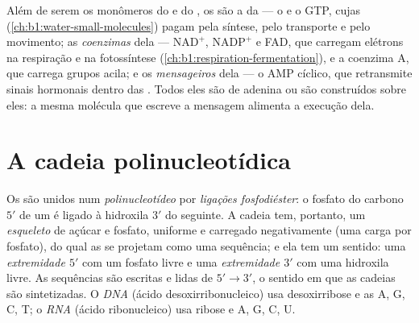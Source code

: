 \begin{proposition}\label{prop:b1:nucleic-acids:threejobs}
Além de serem os monômeros do  e do , os  são a
\emph{} da  --- o  e o GTP, cujas  (\cref{ch:b1:water-small-molecules}) pagam pela síntese,
pelo transporte e pelo movimento; as \emph{coenzimas} dela ---
$\mathrm{NAD^+}$, $\mathrm{NADP^+}$ e FAD, que carregam elétrons na
respiração e na fotossíntese
(\cref{ch:b1:respiration-fermentation}), e a coenzima A, que carrega
grupos acila; e os \emph{mensageiros} dela --- o AMP cíclico, que
retransmite sinais hormonais dentro das . Todos eles são
 de adenina ou são construídos sobre eles: a mesma molécula
que escreve a mensagem alimenta a execução dela.
\end{proposition}

\section{A cadeia polinucleotídica}

\begin{definition}\label{def:b1:nucleic-acids:chain}
Os  são unidos num
\emph{polinucleotídeo} por
\emph{ligações fosfodiéster}: o fosfato do
carbono $5'$ de um  é ligado à hidroxila $3'$ do seguinte. A
cadeia tem, portanto, um \emph{esqueleto} de açúcar e fosfato, uniforme
e carregado negativamente (uma carga por fosfato), do qual as  se
projetam como uma sequência; e ela tem um sentido: uma
\emph{extremidade $5'$} com um
fosfato livre e uma
\emph{extremidade $3'$} com uma
hidroxila livre. As sequências são escritas e lidas de $5' \to 3'$, o
sentido em que as cadeias são sintetizadas. O \emph{DNA}
(ácido desoxirribonucleico) usa desoxirribose e as  A, G, C, T; o
\emph{RNA} (ácido ribonucleico) usa ribose e A, G, C, U.
\end{definition}

